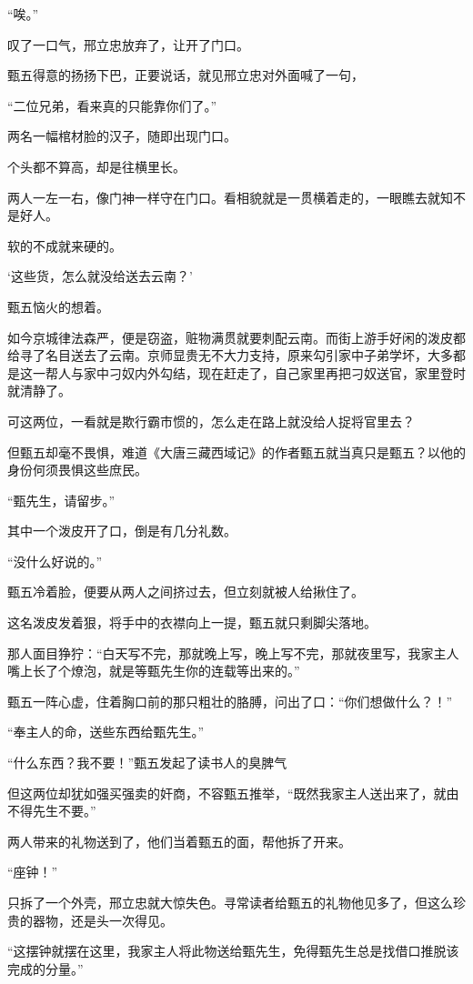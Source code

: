 “唉。”

叹了一口气，邢立忠放弃了，让开了门口。

甄五得意的扬扬下巴，正要说话，就见邢立忠对外面喊了一句，

“二位兄弟，看来真的只能靠你们了。”

两名一幅棺材脸的汉子，随即出现门口。

个头都不算高，却是往横里长。

两人一左一右，像门神一样守在门口。看相貌就是一贯横着走的，一眼瞧去就知不是好人。

软的不成就来硬的。

‘这些货，怎么就没给送去云南？’

甄五恼火的想着。

如今京城律法森严，便是窃盗，赃物满贯就要刺配云南。而街上游手好闲的泼皮都给寻了名目送去了云南。京师显贵无不大力支持，原来勾引家中子弟学坏，大多都是这一帮人与家中刁奴内外勾结，现在赶走了，自己家里再把刁奴送官，家里登时就清静了。

可这两位，一看就是欺行霸市惯的，怎么走在路上就没给人捉将官里去？

但甄五却毫不畏惧，难道《大唐三藏西域记》的作者甄五就当真只是甄五？以他的身份何须畏惧这些庶民。

“甄先生，请留步。”

其中一个泼皮开了口，倒是有几分礼数。

“没什么好说的。”

甄五冷着脸，便要从两人之间挤过去，但立刻就被人给揪住了。

这名泼皮发着狠，将手中的衣襟向上一提，甄五就只剩脚尖落地。

那人面目狰狞：“白天写不完，那就晚上写，晚上写不完，那就夜里写，我家主人嘴上长了个燎泡，就是等甄先生你的连载等出来的。”

甄五一阵心虚，住着胸口前的那只粗壮的胳膊，问出了口：“你们想做什么？！”

“奉主人的命，送些东西给甄先生。”

“什么东西？我不要！”甄五发起了读书人的臭脾气

但这两位却犹如强买强卖的奸商，不容甄五推举，“既然我家主人送出来了，就由不得先生不要。”

两人带来的礼物送到了，他们当着甄五的面，帮他拆了开来。

“座钟！”

只拆了一个外壳，邢立忠就大惊失色。寻常读者给甄五的礼物他见多了，但这么珍贵的器物，还是头一次得见。

“这摆钟就摆在这里，我家主人将此物送给甄先生，免得甄先生总是找借口推脱该完成的分量。”

